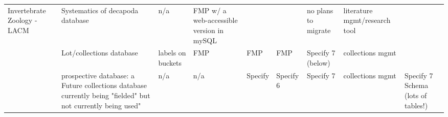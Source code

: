 {\begin{tabular}{@{}lllllllll@{}}
\multicolumn{1}{|l|}{\multirow{3}{*}{Invertebrate Zoology - LACM}} & \multicolumn{1}{l|}{Systematics of decapoda database} & \multicolumn{1}{l|}{n/a} & \multicolumn{1}{l|}{FMP w/ a web-accessible version in mySQL} & \multicolumn{1}{l|}{} & \multicolumn{1}{l|}{} & \multicolumn{1}{l|}{no plans to migrate} & \multicolumn{1}{l|}{literature mgmt/research tool} &  \\ \cmidrule(lr){2-8}
\multicolumn{1}{|l|}{} & \multicolumn{1}{l|}{Lot/collections database} & \multicolumn{1}{l|}{labels on buckets} & \multicolumn{1}{l|}{FMP} & \multicolumn{1}{l|}{FMP} & \multicolumn{1}{l|}{FMP} & \multicolumn{1}{l|}{Specify 7 (below)} & \multicolumn{1}{l|}{collections mgmt} &  \\ \cmidrule(l){2-9} 
\multicolumn{1}{|l|}{} & \multicolumn{1}{l|}{prospective database: a Future collections database currently being "fielded" but not currently being used"} & \multicolumn{1}{l|}{n/a} & \multicolumn{1}{l|}{n/a} & \multicolumn{1}{l|}{Specify} & \multicolumn{1}{l|}{Specify 6} & \multicolumn{1}{l|}{Specify 7} & \multicolumn{1}{l|}{collections mgmt} & \multicolumn{1}{l|}{Specify 7 Schema (lots of tables!)} \\ \bottomrule
\end{tabular}
}